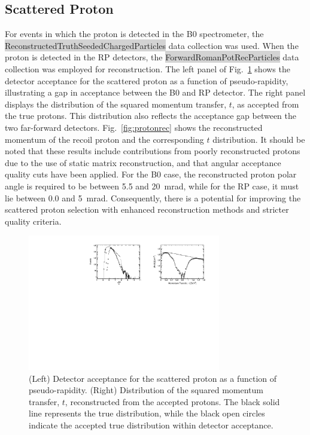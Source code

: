 \documentclass[letterpaper,12pt]{article}
\begin{document}
\subsection{Scattered Proton}\label{subsec:ScatteredProton}
For events in which the proton is detected in the B0 spectrometer, the \colorbox{lightgray}{ReconstructedTruthSeededChargedParticles} data collection was used. When the proton is detected in the RP detectors, the \colorbox{lightgray}{ForwardRomanPotRecParticles} data collection was employed for reconstruction. The left panel of Fig.~\ref{fig:protonacc} shows the detector acceptance for the scattered proton as a function of pseudo-rapidity, illustrating a gap in acceptance between the B0 and RP detector. The right panel displays the distribution of the squared momentum transfer, $t$, as accepted from the true protons. This distribution also reflects the acceptance gap between the two far-forward detectors. Fig.~\ref{fig:protonrec} shows the reconstructed momentum of the recoil proton and the corresponding $t$ distribution. It should be noted that these results include contributions from poorly reconstructed protons due to the use of static matrix reconstruction, and that angular acceptance quality cuts have been applied. For the B0 case, the reconstructed proton polar angle is required to be between 5.5 and 20~mrad, while for the RP case, it must lie between 0.0 and 5~mrad. Consequently, there is a potential for improving the scattered proton selection with enhanced reconstruction methods and stricter quality criteria.

\begin{figure}[ht]
    \centering
    \includegraphics[width=0.75\textwidth]{Figures/proton_acc.pdf}
    \caption{(Left) Detector acceptance for the scattered proton as a function of pseudo-rapidity. (Right) Distribution of the squared momentum transfer, $t$, reconstructed from the accepted protons. The black solid line represents the true distribution, while the black open circles indicate the accepted true distribution within detector acceptance.}
\label{fig:protonacc}
\end{figure}
\end{document}
